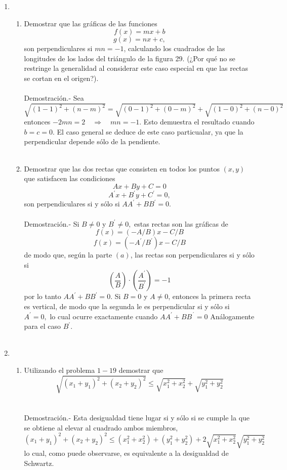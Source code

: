 \begin{enumerate}
    \item 
    \begin{enumerate}[\bfseries (a)]

	\item Demostrar que las gráficas de las funciones $$f(x)=mx+b$$ $$g(x)=nx+c,$$ son perpendiculares si $mn=-1$, calculando los cuadrados de las longitudes de los lados del triángulo de la figura 29. (¿Por qué no se restringe la generalidad al considerar este caso especial en que las rectas se cortan en el origen?).\\\\
	    Demostración.-\; Sea $\sqrt{(1-1)^2+(n-m)^2} = \sqrt{(0-1)^2+(0-m)^2} + \sqrt{(1-0)^2+(n-0)^2}$ entonces $-2mn=2 \quad \Rightarrow \quad mn=-1$. Esto demuestra el resultado cuando $b=c=0$. El caso general se deduce de este caso particualar, ya que la perpendicular depende sólo de la pendiente.\\\\

	\item Demostrar que las dos rectas que consisten en todos los puntos $(x,y)$ que satisfacen las condiciones $$Ax +By +C=0$$ $$A^{'}x + B^{'} y + C^{'} = 0,$$ son perpendiculares si y sólo si $AA^{'} + BB^{'} = 0$.\\\\
	    Demostración.-\; Si $B\neq 0$ y $B^{'} \neq 0,$ estas rectas son las gráficas de $$f(x)=(-A/B)x - C/B$$ $$f(x)=(-A^{'}/B^{'})x - C/B$$ de modo que, según la parte $(a)$, las rectas son perpendiculares si y sólo si $$\left(\dfrac{A}{B}\right)\cdot \left(\dfrac{A^{'}}{B^{'}}\right)=-1$$ por lo tanto $AA^{'}+BB^{'}=0$. Si $B=0$ y $A\neq 0$, entonces la primera recta es vertical, de modo que la segunda le es perpendicular si y sólo si $A^{'}=0,$ lo cual ocurre exactamente cuando $AA^{'} + BB^{´}=0$ Análogamente para el caso $B^{'}$.\\\\

    \end{enumerate}
    
    \item  
    \begin{enumerate}[\bfseries (a)]

	\item Utilizando el problema $1-19$ demostrar que $$\sqrt{(x_1+y_1)^2 + (x_2+y_2)^2} \leq \sqrt{x_1^2 + x_2^2} + \sqrt{y_1^2 + y_2^2}$$\\\\
	    Demostración.-\; Esta desigualdad tiene lugar si y sólo si se cumple la que se obtiene al elevar al cuadrado ambos miembros, $$(x_1+y_1)^2+(x_2+y_2)^2\leq (x_1^2+x_2^2)+(y_1^2+y_2^2)+2\sqrt{x_1^2+x_2^2}\sqrt{y_1^2+y_2^2}$$ lo cual, como puede observarse, es equivalente a la desigualdad de Schwartz.\\\\


\end{enumerate}
\end{enumerate}
